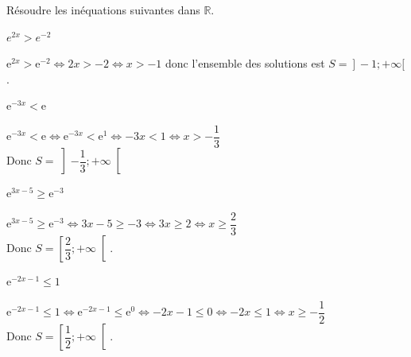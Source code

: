 \documentclass[11pt,a4paper]{article}  %
\begin{document}
Résoudre les inéquations suivantes dans $\mathbb{R}$.
\begin{enumMet}
	\item $e^{2 x}>e^{-2}$
	\begin{corrBox}
		$\mathrm{e}^{2 x}>\mathrm{e}^{-2} \Leftrightarrow 2 x>-2 \Leftrightarrow x>-1$ donc l'ensemble des solutions est $\left.S=\right]-1 ;+\infty[$.		
	\end{corrBox}
	\item $\mathrm{e}^{-3 x}<\mathrm{e}$
	\begin{corrBox}
		$\mathrm{e}^{-3 x}<\mathrm{e} \Leftrightarrow \mathrm{e}^{-3 x}<\mathrm{e}^{1} \Leftrightarrow-3 x<1 \Leftrightarrow x>-\dfrac{1}{3}$\\
		Donc $S=\left]-\dfrac{1}{3} ;+\infty\right[$		
	\end{corrBox}
	\item $\mathrm{e}^{3 x-5} \geqslant \mathrm{e}^{-3}$
	\begin{corrBox}
		$\mathrm{e}^{3 x-5} \geqslant \mathrm{e}^{-3} \Leftrightarrow 3 x-5 \geqslant-3 \Leftrightarrow 3 x \geqslant 2 \Leftrightarrow x \geqslant \dfrac{2}{3}$\\
		Donc $S=\left[\dfrac{2}{3} ;+\infty\right[.$		
	\end{corrBox}
	\item $\mathrm{e}^{-2 x-1} \leqslant 1$
	\begin{corrBox}
		$\mathrm{e}^{-2 x-1} \leqslant 1 \Leftrightarrow \mathrm{e}^{-2 x-1} \leqslant \mathrm{e}^{0} \Leftrightarrow-2 x-1 \leqslant 0 \Leftrightarrow-2 x \leqslant 1 \Leftrightarrow x \geqslant-\dfrac{1}{2}$\\
		Donc $S=\left[\dfrac{1}{2} ;+\infty\right[$.		
	\end{corrBox}
\end{enumMet}
\end{document}
